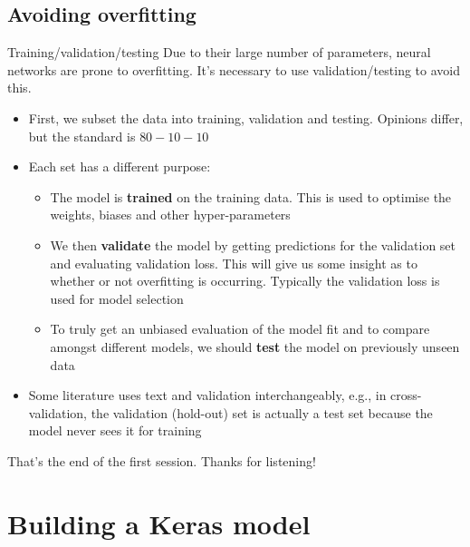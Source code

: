 \documentclass{beamer}
\begin{document}
\subsection{Avoiding overfitting}
\begin{frame}{Training/validation/testing}
Due to their large number of parameters, neural networks are prone to overfitting. It's necessary to use validation/testing to avoid this.
\begin{itemize}
\item First, we subset the data into training, validation and testing. Opinions differ, but the standard is $80-10-10$
\item Each set has a different purpose:
\begin{itemize}
\item The model is \textbf{trained} on the training data. This is used to optimise the weights, biases and other hyper-parameters
\item We then \textbf{validate} the model by getting predictions for the validation set and evaluating validation loss. This will give us some insight as to whether or not overfitting is occurring. Typically the validation loss is used for model selection
\item To truly get an unbiased evaluation of the model fit and to compare amongst different models, we should \textbf{test} the model on  previously unseen data
\end{itemize}
\item Some literature uses text and validation interchangeably, e.g., in cross-validation, the validation (hold-out) set is actually a test set because the model never sees it for training
\end{itemize}
\end{frame}
\begin{frame}
\begin{center}
\Huge That's the end of the first session. Thanks for listening!
\end{center}
\end{frame}
\section{Building a Keras model}
\end{document}
